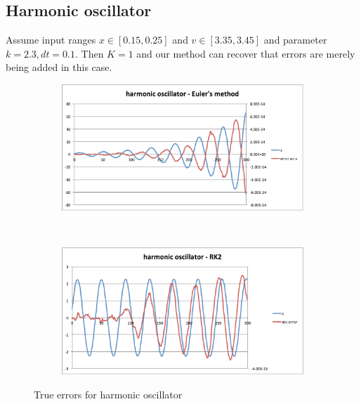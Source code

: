 \documentclass[10pt]{article}
\begin{document}
\subsection{Harmonic oscillator}

Assume input ranges $x \in [0.15, 0.25]$ and $v \in [3.35, 3.45]$
and parameter $k = 2.3, dt = 0.1$.
Then $K = 1$ and our method can recover that errors are merely being added in this case.


\begin{figure}[h!]
  \centering
\begin{subfigure}[b]{0.45\textwidth}
\includegraphics[width=\textwidth]{images/harmonic_euler}
\end{subfigure}%
~ %
\begin{subfigure}[b]{0.45\textwidth}
\includegraphics[width=\textwidth]{images/harmonic_rk2}
\end{subfigure}
\caption{True errors for harmonic oscillator}
\label{fig:harmonic}
\end{figure}
\end{document}
